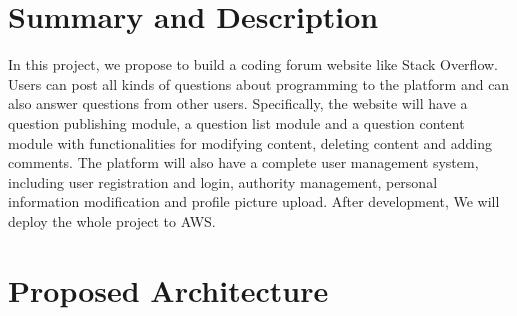\section{Summary and Description}
In this project, we propose to build a coding forum website like Stack Overflow. 
Users can post all kinds of questions about programming to the platform and can also answer questions from other users. Specifically, the website will have a question publishing module, a question list module and a question content module with functionalities for modifying content, deleting content and adding comments. The platform will also have a complete user management system, including user registration and login, authority management, personal information modification and profile picture upload.
After development, We will deploy the whole project to AWS.  





\section{Proposed Architecture}

